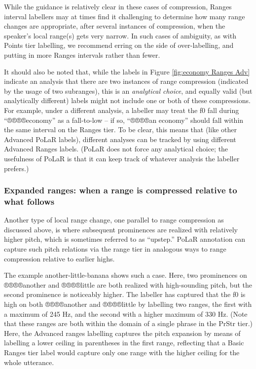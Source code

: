 \documentclass[11pt, twoside]{memoir}
\begin{document}
While the guidance is relatively clear in these cases of compression, Ranges interval labellers may at times find it challenging to determine how many range changes are appropriate, after several instances of compression, when the speaker’s local range(s) gets very narrow. In such cases of ambiguity, as with Points tier labelling, we recommend erring on the side of over-labelling, and putting in more Ranges intervals rather than fewer.

It should also be noted that, while the labels in Figure \ref{fig:economy Ranges Adv} indicate an analysis that there are two instances of range compression (indicated by the usage of two subranges), this is an \emph{analytical choice}, and equally valid (but analytically different) labels might not include one or both of these compressions. For example, under a different analysis, a labeller may treat the f0 fall during “®®®®{economy}” as a fall-to-low – if so, “®®®®{an economy}” should fall within the same interval on the Ranges tier. To be clear, this means that (like other Advanced PoLaR labels), different analyses can be tracked by using different Advanced Ranges labels. (PoLaR does not force any analytical choice; the usefulness of PoLaR is that it can keep track of whatever analysis the labeller prefers.)

\subsubsection{Expanded ranges: when a range is compressed relative to what follows}\label{sec:expanded-ranges-when-a-range-is-compressed-relative-to-what-follows}

Another type of local range change, one parallel to range compression as discussed above, is where subsequent prominences are realized with relatively higher pitch, which is sometimes referred to as “upstep.” PoLaR annotation can capture such pitch relations via the range tier in analogous ways to range compression relative to earlier highs.

The example another-little-banana shows such a case. Here, two prominences on ®®®®{another} and ®®®®{little} are both realized with high-sounding pitch, but the second prominence is noticeably higher. The labeller has captured that the f0 is high on both ®®®®{another} and ®®®®{little} by labelling two ranges, the first with a maximum of 245 Hz, and the second with a higher maximum of 330 Hz. (Note that these ranges are both within the domain of a single phrase in the PrStr tier.) Here, the Advanced ranges labelling captures the pitch expansion by means of labelling a lower ceiling in parentheses in the first range, reflecting that a Basic Ranges tier label would capture only one range with the higher ceiling for the whole utterance.
\end{document}
